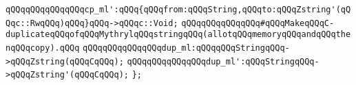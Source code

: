 \verb|qQQqqQQqqQQqqQQqcp_ml':qQQq{qQQqfrom:qQQqString,qQQqto:qQQqZstring'(qQQqc::RwqQQq)qQQq}qQQq->qQQqc::Void;|\newline
\newline
\verb|qQQqqQQqqQQqqQQq#qQQqMakeqQQqC-duplicateqQQqofqQQqMythrylqQQqstringqQQq(allotqQQqmemoryqQQqandqQQqthenqQQqcopy).qQQq|\newline
\verb|qQQqqQQqqQQqqQQqdup_ml:qQQqqQQqStringqQQq->qQQqZstring(qQQqCqQQq);|\newline
\verb|qQQqqQQqqQQqqQQqdup_ml':qQQqStringqQQq->qQQqZstring'(qQQqCqQQq);|\newline
\verb|};|\newline

